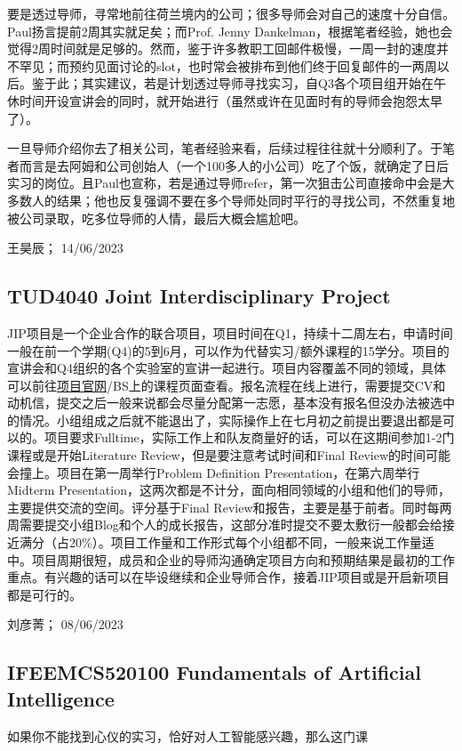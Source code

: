 要是透过导师，寻常地前往荷兰境内的公司；很多导师会对自己的速度十分自信。Paul扬言提前2周其实就足矣；而Prof. Jenny Dankelman，根据笔者经验，她也会觉得2周时间就是足够的。然而，鉴于许多教职工回邮件极慢，一周一封的速度并不罕见；而预约见面讨论的slot，也时常会被排布到他们终于回复邮件的一两周以后。鉴于此；其实建议，若是计划透过导师寻找实习，自Q3各个项目组开始在午休时间开设宣讲会的同时，就开始进行（虽然或许在见面时有的导师会抱怨太早了）。

一旦导师介绍你去了相关公司，笔者经验来看，后续过程往往就十分顺利了。于笔者而言是去阿姆和公司创始人（一个100多人的小公司）吃了个饭，就确定了日后实习的岗位。且Paul也宣称，若是通过导师refer，第一次狙击公司直接命中会是大多数人的结果；他也反复强调不要在多个导师处同时平行的寻找公司，不然重复地被公司录取，吃多位导师的人情，最后大概会尴尬吧。
\begin{flushright}
王昊辰； 14/06/2023
\end{flushright}

\subsection{TUD4040 Joint Interdisciplinary Project}
JIP项目是一个企业合作的联合项目，项目时间在Q1，持续十二周左右，申请时间一般在前一个学期(Q4)的5到6月，可以作为代替实习/额外课程的15学分。项目的宣讲会和Q4组织的各个实验室的宣讲一起进行。项目内容覆盖不同的领域，具体可以前往\href{https://www.jointinterdisciplinaryproject.nl/}{\uline{项目官网}}/BS上的课程页面查看。报名流程在线上进行，需要提交CV和动机信，提交之后一般来说都会尽量分配第一志愿，基本没有报名但没办法被选中的情况。小组组成之后就不能退出了，实际操作上在七月初之前提出要退出都是可以的。项目要求Fulltime，实际工作上和队友商量好的话，可以在这期间参加1-2门课程或是开始Literature Review，但是要注意考试时间和Final Review的时间可能会撞上。项目在第一周举行Problem Definition Presentation，在第六周举行Midterm Presentation，这两次都是不计分，面向相同领域的小组和他们的导师，主要提供交流的空间。评分基于Final Review和报告，主要是基于前者。同时每两周需要提交小组Blog和个人的成长报告，这部分准时提交不要太敷衍一般都会给接近满分（占20\%）。项目工作量和工作形式每个小组都不同，一般来说工作量适中。项目周期很短，成员和企业的导师沟通确定项目方向和预期结果是最初的工作重点。有兴趣的话可以在毕设继续和企业导师合作，接着JIP项目或是开启新项目都是可行的。

\begin{flushright}
刘彦菁； 08/06/2023
\end{flushright}
\subsection{IFEEMCS520100 Fundamentals of Artificial Intelligence}
如果你不能找到心仪的实习，恰好对人工智能感兴趣，那么这门课

